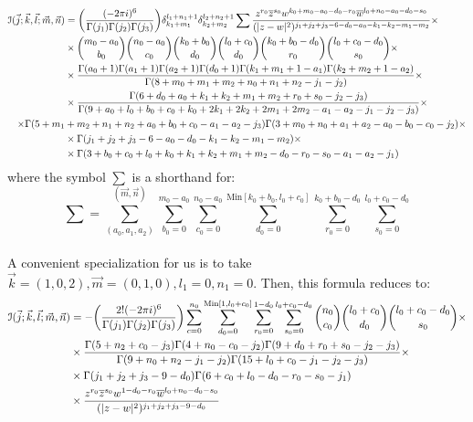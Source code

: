 \documentclass[a4paper,11pt]{article}
\begin{document}
\begingroup \allowdisplaybreaks \begin{align}
\mathcal{I}(\vec{j};\vec{k},\vec{l};\vec{m}, \vec{n}) &= \bigg(\frac{(-2 \pi i)^6}{\Gamma(j_1) \Gamma(j_2) \Gamma(j_3)} \bigg) \delta_{k_1+m_1}^{l_1+n_1+1} \delta_{k_2+m_2}^{l_2+n_2+1} \sum \frac{z^{r_0} \overline{z}^{s_0} w^{k_0+m_0-a_0-d_0-r_0} \overline{w}^{l_0+n_0-a_0-d_0-s_0}}{(\vert z-w \vert^2)^{j_1+j_2+j_3-6-d_0-a_0-k_1-k_2-m_1-m_2}} \times \notag \\
    &\times {m_0-a_0 \choose b_0} {n_0-a_0 \choose c_0} {k_0+b_0 \choose d_0} {l_0+c_0 \choose d_0} {k_0+b_0-d_0 \choose r_0} {l_0+c_0-d_0 \choose s_0}  \times \notag \\
    &\times \frac{\Gamma(a_0+1) \Gamma(a_1+1) \Gamma(a_2+1) \Gamma(d_0+1) \Gamma(k_1+m_1+1-a_1) \Gamma(k_2+m_2+1-a_2)}{\Gamma(8+m_0+m_1+m_2+n_0+n_1+n_2-j_1-j_2)} \times \notag \\
    &\times \frac{\Gamma(6+d_0+a_0+k_1+k_2+m_1+m_2+r_0+s_0-j_2-j_3)}{\Gamma(9+a_0+l_0+b_0+c_0+k_0+2k_1+2k_2+2m_1+2m_2-a_1-a_2-j_1-j_2-j_3)} \times \notag \\
    \times \Gamma(5+m_1&+m_2+n_1+n_2+a_0+b_0+c_0-a_1-a_2-j_3) \Gamma(3+m_0+n_0+a_1+a_2-a_0-b_0-c_0-j_2) \times \notag \\
    &\times \Gamma(j_1+j_2+j_3-6-a_0-d_0-k_1-k_2-m_1-m_2) \times \notag \\
    &\times \Gamma(3+b_0+c_0+l_0+k_0+k_1+k_2+m_1+m_2-d_0-r_0-s_0-a_1-a_2-j_1) \notag
\end{align} \endgroup
where the symbol $\sum$ is a shorthand for:
\begin{equation}
    \sum = \sum_{(a_0,a_1,a_2)}^{(\vec{m},\vec{n})} \sum_{b_0=0}^{m_0-a_0} \sum_{c_0=0}^{n_0-a_0} \overset{\text{Min}[k_0+b_0,l_0+c_0]}{\sum_{d_0=0}} \sum_{r_0=0}^{k_0+b_0-d_0} \sum_{s_0=0}^{l_0+c_0-d_0} 
\end{equation}
\\
A convenient specialization for us is to take $\vec{k} = (1,0,2),\vec{m}=(0,1,0),l_1=0,n_1=0$. Then, this formula reduces to:
\begingroup \allowdisplaybreaks \begin{align} 
\mathcal{I}(\vec{j};\vec{k},\vec{l};\vec{m}, \vec{n}) &= - \bigg(\frac{2! (-2 \pi i)^6}{\Gamma(j_1) \Gamma(j_2) \Gamma(j_3)} \bigg)\sum_{c=0}^{n_0} \overset{\text{Min}[1,l_0+c_0]}{\sum_{d_0=0}}  \sum_{r_0=0}^{1-d_0} \sum_{s_0=0}^{l_0+c_0-d_0} {n_0 \choose c_0} {l_0+c_0 \choose d_0} {l_0+c_0-d_0 \choose s_0} \times \label{eq: simplified general result} \\
&\times \frac{\Gamma(5+n_2+c_0-j_3) \Gamma(4+n_0-c_0-j_2) \Gamma(9+d_0+r_0+s_0-j_2-j_3)}{\Gamma(9+n_0+n_2-j_1-j_2) \Gamma(15+l_0+c_0-j_1-j_2-j_3)} \times \notag \\
&\times \Gamma(j_1+j_2+j_3-9-d_0) \Gamma(6+c_0+l_0-d_0-r_0-s_0-j_1) \notag \\
&\times \frac{z^{r_0} \overline{z}^{s_0} w^{1-d_0-r_0} \overline{w}^{l_0+n_0-d_0-s_0}}{(\vert z-w \vert^2)^{j_1+j_2+j_3-9-d_0}} \notag 
\end{align}\endgroup
%
\end{document}
